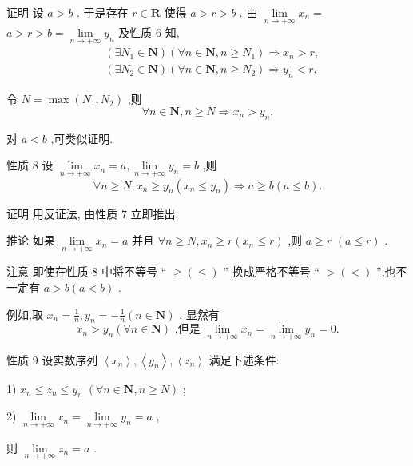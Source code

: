 证明 设 $a > b$ . 于是存在 $r \in  \mathbf{R}$ 使得 $a > r > b$ . 由 $\mathop{\lim }\limits_{{n \rightarrow   + \infty }}{x}_{n} =$  $a > r > b = \mathop{\lim }\limits_{{n \rightarrow   + \infty }}{y}_{n}$ 及性质 6 知,
\begin{align*}
	&\left( {\exists {N}_{1} \in  \mathbf{N}}\right) \left( {\forall n \in  \mathbf{N},n \geq  {N}_{1}}\right)  \Rightarrow  {x}_{n} > r,\\
	&\left( {\exists {N}_{2} \in  \mathbf{N}}\right) \left( {\forall n \in  \mathbf{N},n \geq  {N}_{2}}\right)  \Rightarrow  {y}_{n} < r.
\end{align*}

令 $N = \max \left( {{N}_{1},{N}_{2}}\right)$ ,则
$$\forall n \in  \mathbf{N},n \geq  N \Rightarrow  {x}_{n} > {y}_{n}.$$

对 $a < b$ ,可类似证明.

性质 8 设 $\mathop{\lim }\limits_{{n \rightarrow   + \infty }}{x}_{n} = a,\mathop{\lim }\limits_{{n \rightarrow   + \infty }}{y}_{n} = b$ ,则
$$\forall n \geq  N,{x}_{n} \geq  {y}_{n}\left( {{x}_{n} \leq  {y}_{n}}\right)  \Rightarrow  a \geq  b\left( {a \leq  b}\right) .$$

证明 用反证法, 由性质 7 立即推出.

推论 如果 $\mathop{\lim }\limits_{{n \rightarrow   + \infty }}{x}_{n} = a$ 并且 $\forall n \geq  N,{x}_{n} \geq  r\left( {{x}_{n} \leq  r}\right)$ ,则 $a \geq  r$  $\left( {a \leq  r}\right)$ .

注意 即使在性质 8 中将不等号 “ $\geq  \left(  \leq  \right)$ ” 换成严格不等号 “ $> \left(  < \right)$ ”,也不一定有 $a > b\left( {a < b}\right)$ .

例如,取 ${x}_{n} = \frac{1}{n},{y}_{n} =  - \frac{1}{n}\left( {n \in  \mathbf{N}}\right)$ . 显然有
$${x}_{n} > {y}_{n}\left( {\forall n \in  \mathbf{N}}\right) \text{ ,但是 }\mathop{\lim }\limits_{{n \rightarrow   + \infty }}{x}_{n} = \mathop{\lim }\limits_{{n \rightarrow   + \infty }}{y}_{n} = 0.$$

性质 9 设实数序列 $\left\langle  {x}_{n}\right\rangle  ,\left\langle  {y}_{n}\right\rangle  ,\left\langle  {z}_{n}\right\rangle$ 满足下述条件:

1) ${x}_{n} \leq  {z}_{n} \leq  {y}_{n}\;\left( {\forall n \in  \mathbf{N},n \geq  N}\right)$ ;

2) $\mathop{\lim }\limits_{{n \rightarrow   + \infty }}{x}_{n} = \mathop{\lim }\limits_{{n \rightarrow   + \infty }}{y}_{n} = a$ ,

则 $\mathop{\lim }\limits_{{n \rightarrow   + \infty }}{z}_{n} = a$ .

